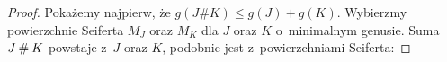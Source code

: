 \begin{proof}
    Pokażemy najpierw, że $g(J \# K) \le g(J) + g(K)$.
    Wybierzmy powierzchnie Seiferta $M_J$ oraz $M_K$ dla $J$ oraz $K$ o~minimalnym genusie.
    Suma $J \mathbin{\#} K$ powstaje z~$J$ oraz $K$, podobnie jest z~powierzchniami Seiferta:
\begin{comment}
    \[
        \begin{tikzpicture}[baseline=-0.65ex,scale=0.12]
        \draw[semithick,-Latex] (-7, -5) to (-5, -5) [in=right, out=right] to (-5, 5) to (-7, 5);
        \draw[semithick,Latex-] ( 7, -5) to ( 5, -5) [in=left, out=left] to ( 5, 5) to ( 7, 5);
        \node at (-5, 0) {$J$};
        \node at (5, 0) {$K$};
        \end{tikzpicture}
        \longrightarrow
        \begin{tikzpicture}[baseline=-0.65ex,scale=0.12]
        \draw[semithick,-Latex] (-7, -5) to (-5, -5) to [out=right, in=left] (-2, -2) -- (2, -2) to [out=right, in=left] (5, -5) to (7, -5);
        \draw[semithick,Latex-] (-7, 5) to (-5,  5) to [out=right, in=left] (-2,  2) -- (2,  2) to [out=right, in=left] (5,  5) to (7, 5);
        \node at (0, -5) {$J \# K$};
        \end{tikzpicture}
        \quad\quad
        \begin{tikzpicture}[baseline=-0.65ex,scale=0.12]
        \draw[semithick,fill=blue!10!white] (-10, -5) to (-5, -5) [in=right, out=right] to (-5, 5) to (-10, 5);
        \draw[semithick,fill=blue!10!white] ( 10, -5) to ( 5, -5) [in=left, out=left] to ( 5, 5) to (10, 5);
        \node at (-6.5, 0) {$M_J$};
        \node at (6.5, 0) {$M_K$};
        \end{tikzpicture}
        \longrightarrow
        \begin{tikzpicture}[baseline=-0.65ex,scale=0.12]
        \fill[blue!10!white] (-7, -5) rectangle (7, 5);
        \draw[semithick,fill=white] (-7, -5) to (-5, -5) to [out=right, in=left] (-2, -2) -- (2, -2) to [out=right, in=left] (5, -5) to (7, -5);
        \draw[semithick,fill=white] (-7, 5) to (-5,  5) to [out=right, in=left] (-2,  2) -- (2,  2) to [out=right, in=left] (5,  5) to (7, 5);
        \node at (0, 0) {$M_{J \# K}$};
        \end{tikzpicture}
    \]
\end{comment}


\end{proof}
